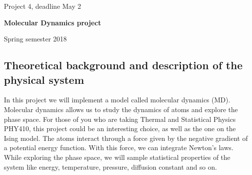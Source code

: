 \documentclass[%
oneside,                 %
final,                   %
10pt]{article}
\begin{document}

\newcommand{\exercisesection}[1]{\subsection*{#1}}






\thispagestyle{empty}

\begin{center}
{\LARGE\bf
\begin{spacing}{1.25}
Project 4, deadline  May 2
\end{spacing}
}
\end{center}


\begin{center}
{\bf Molecular Dynamics project${}^{}$} \\ [0mm]
\end{center}

\begin{center}
\end{center}
    

\begin{center}
Spring semester 2018
\end{center}

\vspace{1cm}


\subsection*{Theoretical background and description of the physical system}
In this project we will implement a model called molecular dynamics (MD). Molecular dynamics allows us to study the dynamics of atoms and explore the phase space. For those of you who are taking Thermal and Statistical Physics PHY410, this project could be an interesting choice, as well as the one on the Ising model. 
The atoms interact through a force given by the negative gradient of a potential energy function. With this force, we can integrate Newton's laws. While exploring the phase space, we will sample statistical properties of the system like energy, temperature, pressure, diffusion constant and so on.
\end{document}
